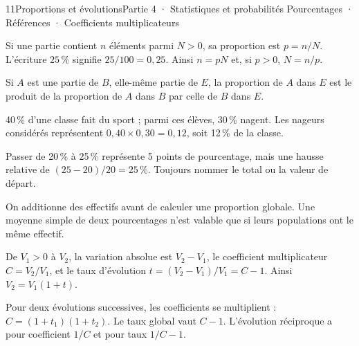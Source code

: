 \begin{ouverture}[statistique]{11}{Proportions et évolutions}{Partie 4 · Statistiques et probabilités}
{Pourcentages · Références · Coefficients multiplicateurs}
\end{ouverture}
\pagestyle{otMain}\essentiel\fontsize{11}{15}\selectfont
{}
\begin{definition}Si une partie contient $n$ éléments parmi $N>0$, sa proportion est $p=n/N$. L’écriture $25\,\%$ signifie $25/100=0{,}25$. Ainsi $n=pN$ et, si $p>0$, $N=n/p$.\end{definition}
\begin{propriete}Si $A$ est une partie de $B$, elle-même partie de $E$, la proportion de $A$ dans $E$ est le produit de la proportion de $A$ dans $B$ par celle de $B$ dans $E$.\end{propriete}
\begin{exemple}40\,\% d’une classe fait du sport ; parmi ces élèves, 30\,\% nagent. Les nageurs considérés représentent $0{,}40\times0{,}30=0{,}12$, soit 12\,\% de la classe.\end{exemple}
\begin{attention}Passer de 20\,\% à 25\,\% représente 5 points de pourcentage, mais une hausse relative de $(25-20)/20=25\,\%$. Toujours nommer le total ou la valeur de départ.\end{attention}
\begin{savoirfaire}On additionne des effectifs avant de calculer une proportion globale. Une moyenne simple de deux pourcentages n’est valable que si leurs populations ont le même effectif.\end{savoirfaire}
\clearpage
{}
\begin{definition}De $V_1>0$ à $V_2$, la variation absolue est $V_2-V_1$, le coefficient multiplicateur $C=V_2/V_1$, et le taux d’évolution $t=(V_2-V_1)/V_1=C-1$. Ainsi $V_2=V_1(1+t)$.\end{definition}
\begin{propriete}Pour deux évolutions successives, les coefficients se multiplient : $C=(1+t_1)(1+t_2)$. Le taux global vaut $C-1$. L’évolution réciproque a pour coefficient $1/C$ et pour taux $1/C-1$.\end{propriete}
